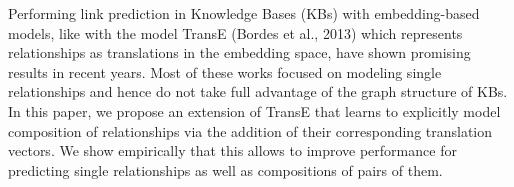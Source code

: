 Performing link prediction in Knowledge Bases (KBs) with embedding-based models, like with the model TransE (Bordes et al., 2013) which represents relationships as translations in the embedding space, have shown promising results in recent years. Most of these works focused on modeling single relationships and hence do not take full advantage of the graph structure of KBs. In this paper, we propose an extension of TransE that learns to explicitly model composition of relationships via the addition of their corresponding translation vectors. We show empirically that this allows to improve performance for predicting single relationships as well as compositions of pairs of them.
